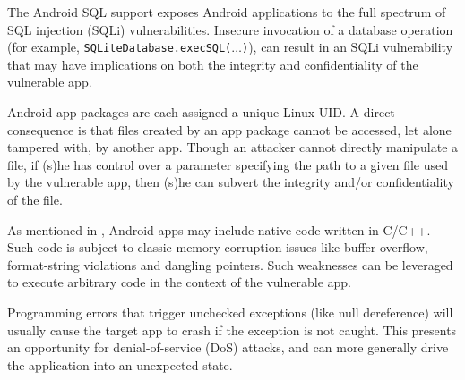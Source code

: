 The Android SQL
support exposes Android applications to the full spectrum of SQL injection (SQLi) vulnerabilities.
Insecure invocation of a database operation (for example, \texttt{SQLiteDatabase.execSQL($\ldots$)}), can result in an SQLi vulnerability that may have
implications on both the integrity and confidentiality of the vulnerable
app.

 Android
app packages are each assigned a unique Linux UID. A direct consequence
is that files created by an app package cannot be accessed,
let alone tampered with, by another app. Though an attacker cannot directly manipulate a file, if (s)he has control over a parameter specifying the path to a given
 file used by the vulnerable app, then (s)he can subvert
the integrity and/or confidentiality of the file.

 As mentioned in , Android apps may include
native code written in C/C++. Such code is subject
to classic memory corruption issues like buffer overflow, 
format-string violations and dangling pointers. Such weaknesses can be leveraged to execute arbitrary
code in the context of the vulnerable app.


 Programming errors that trigger unchecked exceptions (like null dereference)
will usually cause the target app to crash if the exception
is not caught. This presents an opportunity for denial-of-service (DoS) attacks, and can more generally drive the application into an unexpected state.